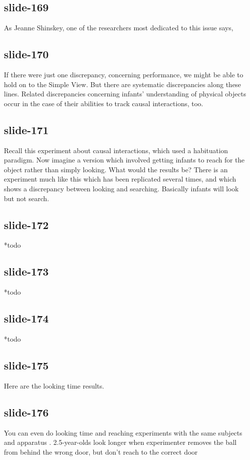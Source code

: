 \documentclass[12pt,\papersize]{extarticle}
\begin{document}
 
\subsection{slide-169}
As Jeanne Shinskey, one of the researchers most dedicated to this issue says,
 
 
\subsection{slide-170}
If there were just one discrepancy, concerning performance, we might be able to hold on to the Simple View. But there are systematic discrepancies along these lines.
Related discrepancies concerning infants' understanding of physical objects occur in the case of their abilities to track causal interactions, too.
 
 
\subsection{slide-171}
Recall this experiment about causal interactions, which used a habituation paradigm. Now imagine a version which involved getting infants to reach for the object rather than simply looking. What would the results be? There is an experiment much like this which has been replicated several times, and which shows a discrepancy between looking and searching. Basically infants will look but not search.
 
 
\subsection{slide-172}
*todo
 
 
\subsection{slide-173}
*todo
 
 
\subsection{slide-174}
*todo
 
 
\subsection{slide-175}
Here are the looking time results.
 
 
\subsection{slide-176}
You can even do looking time and reaching experiments with the same subjects and apparatus \citep{Hood:2003yg}.
2.5-year-olds look longer when experimenter removes the ball from behind the wrong door, but don't reach to the correct door
 
\end{document}
